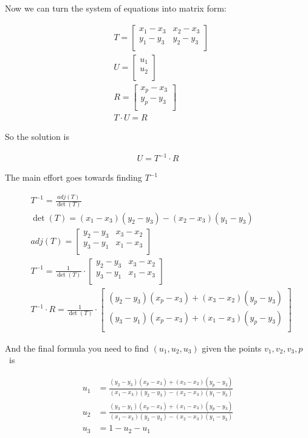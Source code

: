 \documentclass{article}
\begin{document}
Now we can turn the system of equations into matrix form:

\begin{align}
  & T =
  \begin{bmatrix}
    x_1 - x_3 & x_2 - x_3 \\
    y_1 - y_3 & y_2 - y_3 \\
  \end{bmatrix} \\
  & U = \begin{bmatrix}
    u_1 \\ u_2 \\
  \end{bmatrix}\\
  & R = \begin{bmatrix}
    x_p - x_3 \\
    y_p - y_3 \\
  \end{bmatrix} \\
  & T \cdot U = R
\end{align}

So the solution is

\begin{align}
  U = T^{-1} \cdot R
\end{align}

The main effort goes towards finding $T^{-1}$

\begin{align}
  & T^{-1} = \frac{adj(T)}{\det(T)} \\
  & \det(T) = (x_1 - x_3)(y_2 - y_3) - (x_2 - x_3)(y_1 - y_3) \\
  & adj(T) = \begin{bmatrix}
    y_2 - y_3 & x_3 - x_2 \\
    y_3 - y_1 & x_1 - x_3 \\
  \end{bmatrix} \\
  & T^{-1} = \frac{1}{\det(T)} \cdot \begin{bmatrix}
    y_2 - y_3 & x_3 - x_2 \\
    y_3 - y_1 & x_1 - x_3 \\
  \end{bmatrix} \\
  & T^{-1}\cdot R = \frac{1}{\det(T)} \cdot \begin{bmatrix}
    (y_2 - y_3)(x_p - x_3) + (x_3 - x_2)(y_p - y_3) \\
    (y_3 - y_1)(x_p - x_3) + (x_1 - x_3)(y_p - y_3) \\
  \end{bmatrix}
\end{align}

And the final formula you need to find $(u_1, u_2, u_3)$ given the points $v_1, v_2, v_3, p$~is

\begin{align}
  u_1 &= \frac{(y_2 - y_3)(x_p - x_3) + (x_3 - x_2)(y_p - y_3)}{(x_1 - x_3)(y_2 - y_3) - (x_2 - x_3)(y_1 - y_3)} \\
  u_2 &= \frac{(y_3 - y_1)(x_p - x_3) + (x_1 - x_3)(y_p - y_3)}{(x_1 - x_3)(y_2 - y_3) - (x_2 - x_3)(y_1 - y_3)} \\
  u_3 &= 1 - u_2 - u_1
\end{align}
\end{document}
